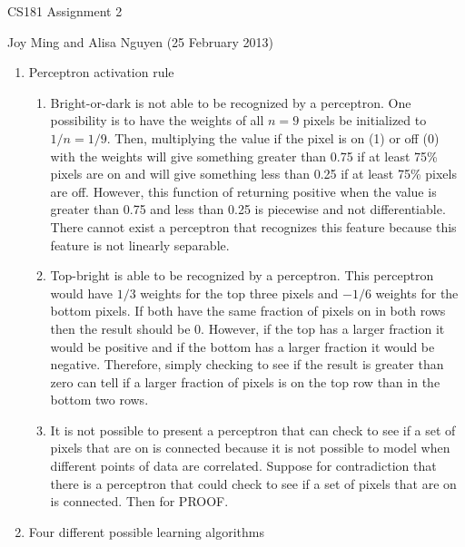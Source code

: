 \documentclass[11pt]{article}
\begin{document}
\begin{center}
\large
CS181 Assignment 2
\end{center}
Joy Ming and Alisa Nguyen (25 February 2013)\\

\begin{enumerate}
\setcounter{enumi}{0}

\item Perceptron activation rule
	\begin{enumerate}
	\item Bright-or-dark is not able to be recognized by a perceptron. One possibility is to have the weights of all $n=9$ pixels be initialized to $1/n=1/9$. Then, multiplying the value if the pixel is on (1) or off (0) with the weights will give something greater than 0.75 if at least 75\% pixels are on and will give something less than 0.25 if at least 75\% pixels are off. However, this function of returning positive when the value is greater than 0.75 and less than 0.25 is piecewise and not differentiable. There cannot exist a perceptron that recognizes this feature because this feature is not linearly separable.
	\item Top-bright is able to be recognized by a perceptron. This perceptron would have $1/3$ weights for the top three pixels and $-1/6$ weights for the bottom pixels. If both have the same fraction of pixels on in both rows then the result should be 0. However, if the top has a larger fraction it would be positive and if the bottom has a larger fraction it would be negative. Therefore, simply checking to see if the result is greater than zero can tell if a larger fraction of pixels is on the top row than in the bottom two rows.
	\item It is not possible to present a perceptron that can check to see if a set of pixels that are on is connected because it is not possible to model when different points of data are correlated. Suppose for contradiction that there is a perceptron that could check to see if a set of pixels that are on is connected. Then for PROOF.
	\end{enumerate}
\item Four different possible learning algorithms
	\begin{enumerate}

\end{enumerate}
\end{enumerate}
\end{document}
